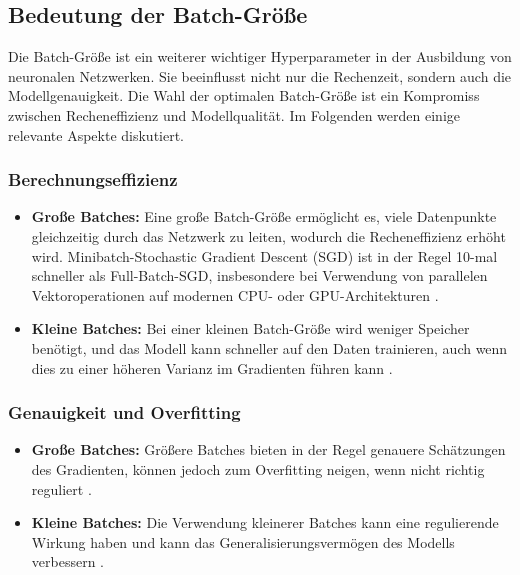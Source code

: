 \subsection{Bedeutung der Batch-Größe}
\label{sec: Batch}

Die Batch-Größe ist ein weiterer wichtiger Hyperparameter in der Ausbildung von neuronalen Netzwerken. Sie beeinflusst nicht nur die Rechenzeit, sondern auch die Modellgenauigkeit. Die Wahl der optimalen Batch-Größe ist ein Kompromiss zwischen Recheneffizienz und Modellqualität. Im Folgenden werden einige relevante Aspekte diskutiert.

\subsubsection{Berechnungseffizienz}
\begin{itemize}
    \item \textbf{Große Batches:} Eine große Batch-Größe ermöglicht es, viele Datenpunkte gleichzeitig durch das Netzwerk zu leiten, wodurch die Recheneffizienz erhöht wird. Minibatch-Stochastic Gradient Descent (SGD) ist in der Regel 10-mal schneller als Full-Batch-SGD, insbesondere bei Verwendung von parallelen Vektoroperationen auf modernen CPU- oder GPU-Architekturen \cite{russell2021ai}.
    
    \item \textbf{Kleine Batches:} Bei einer kleinen Batch-Größe wird weniger Speicher benötigt, und das Modell kann schneller auf den Daten trainieren, auch wenn dies zu einer höheren Varianz im Gradienten führen kann \cite{morales2020grokking}.
\end{itemize}

\subsubsection{Genauigkeit und Overfitting}
\begin{itemize}
    \item \textbf{Große Batches:} Größere Batches bieten in der Regel genauere Schätzungen des Gradienten, können jedoch zum Overfitting neigen, wenn nicht richtig reguliert \cite{Goodfellow-et-al-2016}.
    
    \item \textbf{Kleine Batches:} Die Verwendung kleinerer Batches kann eine regulierende Wirkung haben und kann das Generalisierungsvermögen des Modells verbessern \cite{Goodfellow-et-al-2016}.
\end{itemize}


